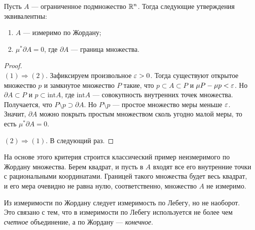 \begin{Statement}
Пусть $A$ --- ограниченное подмножество $\mathbb{R}^n$. Тогда следующие утверждения эквивалентны:
\begin{enumerate}
\item $A$ --- измеримо по Жордану;
\item $\mu^* \partial A = 0$, где $\partial
 A$ --- граница множества.
\end{enumerate}
\end{Statement}
\begin{proof}\ \\
$(1) \Rightarrow (2)$. Зафиксируем произвольное $\varepsilon > 0$. Тогда существуют открытое множество $p$ и замкнутое множество $P$ такие, что $p \subset A \subset P$ и $\mu P- \mu p < \varepsilon$. Но $\partial
 A \subset P$ и $p \subset \mathrm{int} A$, где $\mathrm{int} A$ --- совокупность внутренних точек множества. Получается, что $P \setminus p \supset \partial
 A$. Но $P \setminus p$ --- простое множество меры меньше $\varepsilon$. Значит, $\partial
 A$ можно покрыть простым множеством сколь угодно малой меры, то есть $\mu^* \partial
 A = 0$.

$(2) \Rightarrow (1)$. В следующий раз.
\end{proof}

\begin{Comment}
На основе этого критерия строится классический пример неизмеримого по Жордану множества. Берем квадрат, и пусть в $A$ входят все его внутренние точки с рациональными координатами. Границей такого множества будет весь квадрат, и его мера очевидно не равна нулю, соответственно, множество $A$ не измеримо.
\end{Comment}
\begin{Comment}
Из измеримости по Жордану следует измеримость по Лебегу, но не наоборот. Это связано с тем, что в измеримости по Лебегу используется не более чем \textit{счетное} объединение, а по Жордану --- \textit{конечное}.
\end{Comment}